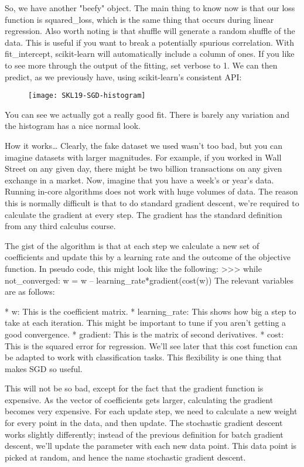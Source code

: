 So, we have another "beefy" object. The main thing to know now is that our loss function is
squared_loss, which is the same thing that occurs during linear regression. Also worth
noting is that shuffle will generate a random shuffle of the data. This is useful if you want to
break a potentially spurious correlation. With fit_intercept, scikit-learn will automatically
include a column of ones. If you like to see more through the output of the fitting, set
verbose to 1.
We can then predict, as we previously have, using scikit-learn's consistent API:

\begin{figure}
\centering
\texttt{[image: SKL19-SGD-histogram]}
\caption{}
\label{fig:SKL19-SGD-histogram}
\end{figure}

You can see we actually got a really good fit. There is barely any variation and the histogram
has a nice normal look.

How it works…
Clearly, the fake dataset we used wasn't too bad, but you can imagine datasets with larger
magnitudes. For example, if you worked in Wall Street on any given day, there might be two
billion transactions on any given exchange in a market. Now, imagine that you have a week's
or year's data. Running in-core algorithms does not work with huge volumes of data.
The reason this is normally difficult is that to do standard gradient descent, we're required to
calculate the gradient at every step. The gradient has the standard definition from any third
calculus course.

The gist of the algorithm is that at each step we calculate a new set of coefficients and
update this by a learning rate and the outcome of the objective function.
In pseudo code, this might look like the following:
>>> while not_converged:
w = w – learning_rate*gradient(cost(w))
The relevant variables are as follows:

*   w: This is the coefficient matrix.
*   learning_rate: This shows how big a step to take at each iteration. This might
be important to tune if you aren't getting a good convergence.
*   gradient: This is the matrix of second derivatives.
*   cost: This is the squared error for regression. We'll see later that this cost function
can be adapted to work with classification tasks. This flexibility is one thing that
makes SGD so useful.

This will not be so bad, except for the fact that the gradient function is expensive. As the
vector of coefficients gets larger, calculating the gradient becomes very expensive. For each
update step, we need to calculate a new weight for every point in the data, and then update.
The stochastic gradient descent works slightly differently; instead of the previous definition
for batch gradient descent, we'll update the parameter with each new data point. This data
point is picked at random, and hence the name stochastic gradient descent.
